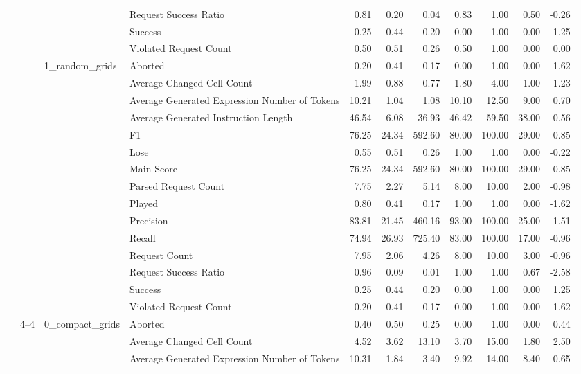 \begin{tabular}{llllrrrrrrr}
 &  &  & Request Success Ratio & 0.81 & 0.20 & 0.04 & 0.83 & 1.00 & 0.50 & -0.26 \\
 &  &  & Success & 0.25 & 0.44 & 0.20 & 0.00 & 1.00 & 0.00 & 1.25 \\
 &  &  & Violated Request Count & 0.50 & 0.51 & 0.26 & 0.50 & 1.00 & 0.00 & 0.00 \\
\cline{3-11}
 &  & \multirow[t]{15}{*}{1_random_grids} & Aborted & 0.20 & 0.41 & 0.17 & 0.00 & 1.00 & 0.00 & 1.62 \\
 &  &  & Average Changed Cell Count & 1.99 & 0.88 & 0.77 & 1.80 & 4.00 & 1.00 & 1.23 \\
 &  &  & Average Generated Expression Number of Tokens & 10.21 & 1.04 & 1.08 & 10.10 & 12.50 & 9.00 & 0.70 \\
 &  &  & Average Generated Instruction Length & 46.54 & 6.08 & 36.93 & 46.42 & 59.50 & 38.00 & 0.56 \\
 &  &  & F1 & 76.25 & 24.34 & 592.60 & 80.00 & 100.00 & 29.00 & -0.85 \\
 &  &  & Lose & 0.55 & 0.51 & 0.26 & 1.00 & 1.00 & 0.00 & -0.22 \\
 &  &  & Main Score & 76.25 & 24.34 & 592.60 & 80.00 & 100.00 & 29.00 & -0.85 \\
 &  &  & Parsed Request Count & 7.75 & 2.27 & 5.14 & 8.00 & 10.00 & 2.00 & -0.98 \\
 &  &  & Played & 0.80 & 0.41 & 0.17 & 1.00 & 1.00 & 0.00 & -1.62 \\
 &  &  & Precision & 83.81 & 21.45 & 460.16 & 93.00 & 100.00 & 25.00 & -1.51 \\
 &  &  & Recall & 74.94 & 26.93 & 725.40 & 83.00 & 100.00 & 17.00 & -0.96 \\
 &  &  & Request Count & 7.95 & 2.06 & 4.26 & 8.00 & 10.00 & 3.00 & -0.96 \\
 &  &  & Request Success Ratio & 0.96 & 0.09 & 0.01 & 1.00 & 1.00 & 0.67 & -2.58 \\
 &  &  & Success & 0.25 & 0.44 & 0.20 & 0.00 & 1.00 & 0.00 & 1.25 \\
 &  &  & Violated Request Count & 0.20 & 0.41 & 0.17 & 0.00 & 1.00 & 0.00 & 1.62 \\
\cline{2-11} \cline{3-11}
 & \multirow[t]{30}{*}{4--4} & \multirow[t]{15}{*}{0_compact_grids} & Aborted & 0.40 & 0.50 & 0.25 & 0.00 & 1.00 & 0.00 & 0.44 \\
 &  &  & Average Changed Cell Count & 4.52 & 3.62 & 13.10 & 3.70 & 15.00 & 1.80 & 2.50 \\
 &  &  & Average Generated Expression Number of Tokens & 10.31 & 1.84 & 3.40 & 9.92 & 14.00 & 8.40 & 0.65 \\

\end{tabular}
